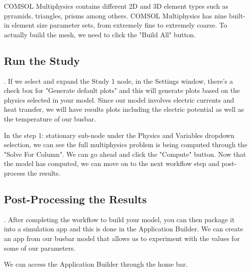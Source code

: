 COMSOL Multiphysics contains different 2D and 3D element types such as pyramids, triangles, prisms among others. COMSOL Multiphysics has nine built-in element size parameter sets, from extremely fine to extremely coarse. To actually build the mesh, we need to click the "Build All" button.


\subsection{Run the Study}.
If we select and expand the Study 1 node, in the Settings window, there's a check box for "Generate default plots" and this will generate plots based on the physics selected in your model. Since our model involves electric currents and heat transfer, we will have results plots including the electric potential as well as the temperature of our busbar.

In the step 1: stationary sub-node under the Physics and Variables dropdown selection, we can see the full multiphysics problem is being computed through the "Solve For Column". We can go ahead and click the "Compute" button. Now that the model has computed, we can move on to the next workflow step and post-process the results.


\subsection{Post-Processing the Results}.
After completing the workflow to build your model, you can then package it into a simulation app and this is done in the Application Builder. We can create an app from our busbar model that allows us to experiment with the values for some of our parameters.

We can access the Application Builder through the home bar.


